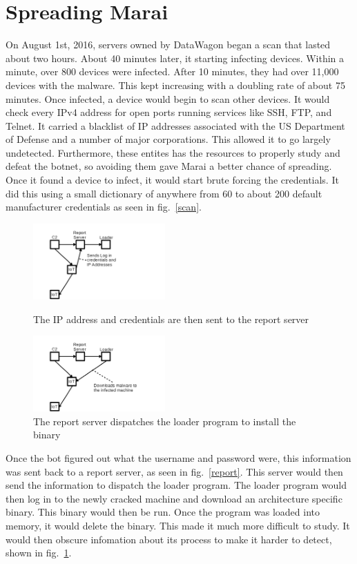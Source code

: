 \documentclass[conference]{IEEEtran}
\begin{document}
\section{Spreading Marai}
On August 1st, 2016, servers owned by DataWagon began a scan that lasted about two hours. About 40 minutes later, it starting infecting devices. Within a minute, over 800 devices were infected. After 10 minutes, they had over 11,000 devices with the malware. This kept increasing with a doubling rate of about 75 minutes. Once infected, a device would begin to scan other devices. It would check every IPv4 address for open ports running services like SSH, FTP, and Telnet. It carried a blacklist of IP addresses associated with the US Department of Defense and a number of major corporations. This allowed it to go largely undetected. Furthermore, these entites has the resources to properly study and defeat the botnet, so avoiding them gave Marai a better chance of spreading. Once it found a device to infect, it would start brute forcing the credentials. It did this using a small dictionary of anywhere from 60 to about 200 default manufacturer credentials as seen in fig.~\ref{scan}. 

 \begin{figure}[t]
\centerline{\includegraphics[width=0.45\textwidth]{../fig2.png}}
\caption{The IP address and credentials are then sent to the report server}
\label{report}
\centerline{\includegraphics[width=0.45\textwidth]{../fig3.png}}
\caption{The report server dispatches the loader program to install the binary}
\label{loader}
\end{figure}

Once the bot figured out what the username and password were, this information was sent back to a report server, as seen in fig.~\ref{report}. This server would then send the information to dispatch the loader program. The loader program would then log in to the newly cracked machine and download an architecture specific binary. This binary would then be run. Once the program was loaded into memory, it would delete the binary. This made it much more difficult to study. It would then obscure infomation about its process to make it harder to detect, shown in fig.~\ref{loader}.
\end{document}
